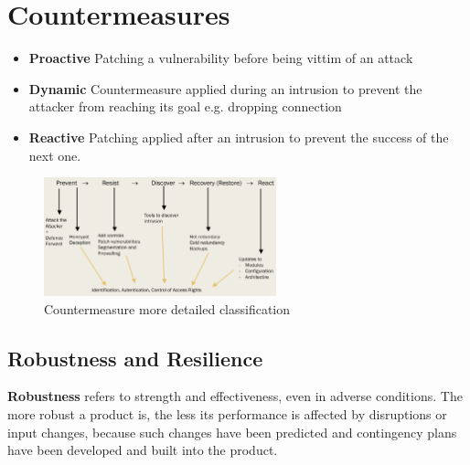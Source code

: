 \chapter{Countermeasures}
\begin{itemize}
    \item \textbf{Proactive} Patching a vulnerability before being vittim of an attack
    \item \textbf{Dynamic} Countermeasure applied during an intrusion to prevent the attacker from reaching its goal e.g. dropping connection
    \item \textbf{Reactive} Patching applied after an intrusion to prevent the success of the next one.
\end{itemize}

\begin{figure}[h]
    \centering
    \includegraphics[width=0.6\textwidth]{images/countermeasure_classification.png}
    \caption{Countermeasure more detailed classification}
    \label{fig:countermeasures_classification}
\end{figure}

\section{Robustness and Resilience}
\textbf{Robustness} refers to strength and effectiveness, even in adverse
conditions. The more robust a product is, the less its performance is
affected by disruptions or input changes, because such changes have
been predicted and contingency plans have been developed and built
into the product.

